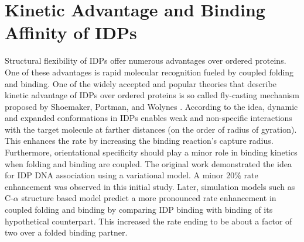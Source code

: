 \documentclass[../talant.diss.submit.tex]{subfiles}
\begin{document}
%
\section{\textbf{Kinetic Advantage and Binding Affinity of IDPs}}\label{sect:one_six}
%

Structural flexibility of IDPs offer numerous advantages over ordered proteins. One of these
advantages is rapid molecular recognition fueled by coupled folding and binding. 
One of the widely accepted and popular theories that describe kinetic advantage
of IDPs over ordered proteins is so called fly-casting mechanism proposed by Shoemaker,
Portman, and Wolynes \cite{shoeportman:00}.
According to the idea, dynamic and expanded conformations in IDPs enables weak and non-specific
interactions with the target molecule at farther distances (on the order of radius of gyration).
This enhances the rate by increasing the binding reaction's capture radius.
Furthermore, orientational specificity should play a minor role in binding kinetics when folding
and binding are coupled.
The original work demonstrated the idea for IDP DNA association using a variational model.
A minor 20\% rate enhancement was observed in this initial study.
Later, simulation models such as C-$\alpha$ structure based model predict a more pronounced rate
enhancement in coupled folding and binding
by comparing IDP binding with binding of its hypothetical counterpart\cite{turjanski:08,huang:09,huang:10a}.
This increased the rate ending to be about a factor of two over a folded binding partner.
%
%
%
%
\end{document}
